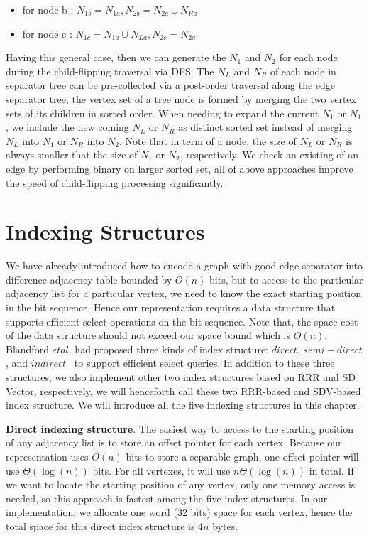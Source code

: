\documentclass[12pt,glossary]{dalthesis}
\begin{document}
\begin{itemize}[noitemsep]
\item for node b : $ N_{1b} = N_{1a}, N_{2b} = N_{2a} \cup N_{Ra}$
\item for node c : $ N_{1c} = N_{1a} \cup N_{La}, N_{2c} = N_{2a}$ 
\end{itemize}

Having this general case, then we can generate the $N_{1}$ and $N_{2}$ for each node during the child-flipping traversal via DFS. The $N_{L}$ and $N_{R}$ of each node in separator tree can be pre-collected via a post-order traversal along the edge separator tree, the vertex set of a tree node is formed by merging the two vertex sets of its children in sorted order. When needing to expand the current $N_{1}$ or $N_{1}$, we include the new coming $N_{L}$ or $N_{R}$ as distinct sorted set instead of merging $N_{L}$ into $N_{1}$ or $N_{R}$ into $N_{2}$. Note that in term of a node, the size of $N_{L}$ or $N_{R}$ is always smaller that the size of $N_{1}$ or $N_{2}$, respectively. We check an existing of an edge by performing binary on larger sorted set, all of above approaches improve the speed of child-flipping processing significantly.

\section{Indexing Structures}

We have already introduced how to encode a graph with good edge separator into difference adjacency table bounded by $O(n)$ bits, but to access to the particular adjacency list for a particular vertex, we need to know the exact starting position in the bit sequence. Hence our representation requires a data structure that supports efficient select operations on the bit sequence. Note that, the space cost of the data structure should not exceed our space bound which is $O(n)$. Blandford $et al.$ had proposed three kinds of index structure: $direct$, $semi-direct$, and $indirect$~\cite{compact-representation} to support efficient select queries. In addition to these three structures, we also implement other two index structures based on RRR and SD Vector, respectively, we will henceforth call these two RRR-based and SDV-based index structure. We will introduce all the five indexing structures in this chapter.

\bigskip
\bigskip

\textbf{Direct indexing structure}. The easiest way to access to the starting position of 
any adjacency list is to store an offset pointer for each vertex. Because our representation uses $O(n)$ bits to store a separable graph, one offset pointer will use $\Theta (\log (n))$ bits. For all vertexes, it will use $n \Theta (\log (n))$ in total. If we want to locate the starting position of any vertex, only one memory access is needed, so this approach is fastest among the five index structures. In our implementation, we allocate one word (32 bits) space for each vertex, hence the total space for this direct index structure is 4$n$ bytes.
\end{document}
